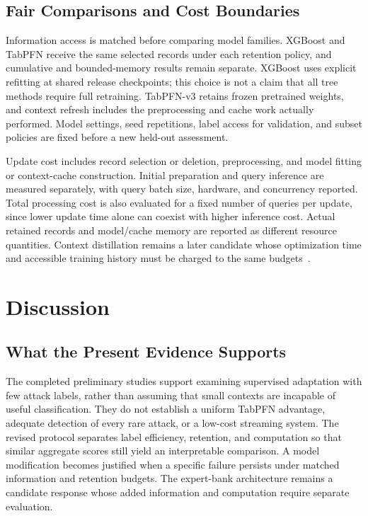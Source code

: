 \documentclass[sigconf,anonymous,pbalance]{acmart}
\begin{document}
\subsection{Fair Comparisons and Cost Boundaries}
\label{sec:protocol-cost}
Information access is matched before comparing model families. XGBoost and TabPFN receive the same selected records under each retention policy, and cumulative and bounded-memory results remain separate. XGBoost uses explicit refitting at shared release checkpoints; this choice is not a claim that all tree methods require full retraining. TabPFN-v3 retains frozen pretrained weights, and context refresh includes the preprocessing and cache work actually performed. Model settings, seed repetitions, label access for validation, and subset policies are fixed before a new held-out assessment.

Update cost includes record selection or deletion, preprocessing, and model fitting or context-cache construction. Initial preparation and query inference are measured separately, with query batch size, hardware, and concurrency reported. Total processing cost is also evaluated for a fixed number of queries per update, since lower update time alone can coexist with higher inference cost. Actual retained records and model/cache memory are reported as different resource quantities. Context distillation remains a later candidate whose optimization time and accessible training history must be charged to the same budgets~\cite{ma2024icd}.


\section{Discussion}
\label{sec:discussion}
\subsection{What the Present Evidence Supports}
The completed preliminary studies support examining supervised adaptation with few attack labels, rather than assuming that small contexts are incapable of useful classification. They do not establish a uniform TabPFN advantage, adequate detection of every rare attack, or a low-cost streaming system. The revised protocol separates label efficiency, retention, and computation so that similar aggregate scores still yield an interpretable comparison. A model modification becomes justified when a specific failure persists under matched information and retention budgets. The expert-bank architecture remains a candidate response whose added information and computation require separate evaluation.
\end{document}
